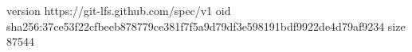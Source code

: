 version https://git-lfs.github.com/spec/v1
oid sha256:37ce53f22cfbeeb878779ce381f7f5a9d79df3e598191bdf9922de4d79af9234
size 87544
